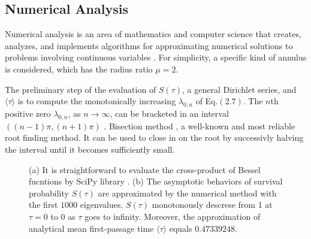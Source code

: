 \newpage

\subsection{Numerical Analysis}

Numerical analysis is an area of mathematics and computer science that
creates, analyzes, and implements algorithms for approximating
numerical solutions to problems involving continuous variables
\cite{brezinski2012numerical}. For simplicity, a specific kind of
annulus is considered, which has the radius ratio $\mu=2$. 

The preliminary step of the evaluation of $S(\tau)$, a general
Dirichlet series, and $\langle \tau \rangle$ is to compute the
monotonically increasing $\lambda_{0,n}$ of Eq.$(2.7)$. The $n$th
positive zero $\lambda_{0,n}$, as $n \rightarrow \infty $, can be
bracketed in an interval $((n-1) \pi, (n+1) \pi)$
\cite{NIST:DLMF}. Bisection method \cite{2020SciPy-NMeth}, a
well-known and most reliable root finding method. It can be used to
close in on the root by successivly halving the interval until it
becomes sufficiently small.

\begin{figure}[h!]
  \centering
  \subfloat[]{\texttt{[image: F0]}}%
  \caption{(a) It is straightforward to evaluate the cross-product of
    Bessel fucntions by SciPy library \cite{2020SciPy-NMeth}. (b) The
    asymptotic behaviors of survival probability $S(\tau)$ are
    approximated by the numerical method with the first $1000$
    eigenvalues. $S(\tau)$ monotonously descrese from 1 at $\tau=0$ to
    $0$ as $\tau$ goes to infinity. Moreover, the approximation of
    analytical mean first-passage time $\langle \tau \rangle$ equals
    $0.47339248$.}
\end{figure}




